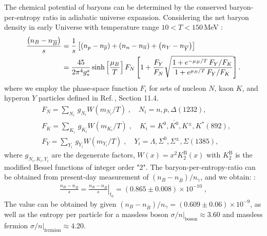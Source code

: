 \documentclass[universe,article,submit,moreauthors,pdftex,a4paper]{Definitions/mdpi}
\begin{document}
The chemical potential of baryons can be determined by the conserved baryon-per-entropy ratio in adiabatic universe expansion. Considering the net baryon density in early Universe with temperature range $10< T< 150$\,MeV \cite{Yang:2021bko}:
\begin{align}\label{Baryon_ChemicalPotential}
\frac{\left(n_B-n_{\overline{B}}\right)}{s}&=\frac{1}{s}\left[\left(n_p-n_{\overline{p}}\right)+\left(n_n-n_{\overline{n}}\right)+\left(n_Y-n_{\overline{Y}}\right)\right]\notag\\
&=\frac{45}{2\pi^4g^s_\ast}\sinh\left[\frac{\mu_B}{T}\right]F_N\left[1+\frac{F_Y}{F_N}\sqrt{\frac{1+e^{-\mu_B/T}\,F_Y/F_K}{1+e^{\mu_B/T}\,F_Y/F_K}}\right].
\end{align}
where we employ the phase-space function $F_i$ for sets of nucleon $N$, kaon $K$, and hyperon $Y$ particles defined in Ref.\,\cite{Letessier:2002gp}, Section 11.4.
\begin{align}
&F_N=\sum_{N_i}\,g_{N_i}W(m_{N_i}/T)\;, \quad N_i=n, p, \Delta(1232),\\
&F_K=\sum_{K_i}\,g_{K_i}W(m_{K_i}/T)\;, \quad K_i=K^0, \overline{K^0}, K^\pm, K^\ast(892),\\
&F_Y=\sum_{Y_i}\,g_{Y_i}W(m_{Y_i}/T)\;, \quad Y_i=\Lambda, \Sigma^0,\Sigma^\pm, \Sigma(1385),
\end{align}
where $g_{N_i,K_i,Y_i}$ are the degenerate factors, $W(x)=x^2K^\mathrm{B}_2(x)$ with $K^\mathrm{B}_2$ is the modified Bessel functions of integer order "$2$". The baryon-per-entropy-ratio can be obtained from present-day measurement of $\left(n_B-n_{\overline{B}}\right)/n_\gamma$, and we obtain: \cite{Yang:2021bko}:
\begin{align}\label{BdS}
\frac{n_B-n_{\overline{B}}}{s}= \left.\frac{n_B-n_{\overline{B}}}{s}\right|_{t_0}=(0.865\pm0.008)\times10^{-10} \;,
\end{align}
The value can be obtained by given $\left(n_B-n_{\overline{B}}\right)/n_\gamma= (0.609\pm0.06)\times10^{-9}$, as well as the entropy per particle for a massless boson $\sigma/n|_\mathrm{boson}\approx 3.60$ and massless fermion $\sigma/n|_\mathrm{fermion}\approx 4.20$.
\end{document}
